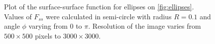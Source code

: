 \documentclass[reprint,amsmath,amssymb,aps,pre,showkeys,showpacs]{revtex4-1}
\begin{document}
\begin{figure}[!hpt]
  \centering
  \hfill
  \caption[]{Plot of the surface-surface function for ellipses on
    \cref{fig:ellipses}. Values of $F_{ss}$ were calculated in semi-circle with
    radius $R = 0.1$ and angle $\phi$ varying from $0$ to $\pi$. Resolution of
    the image varies from $500\times 500$ pixels to $3000\times 3000$.}
  \label{fig:fss-ellipses}
\end{figure}
\end{document}
